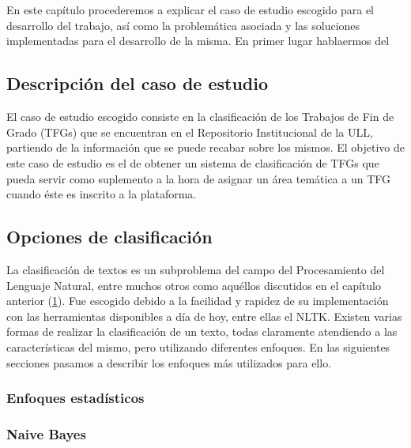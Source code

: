 \chapter{\ChapterTwo{}} \label{amigo}
\lhead{\emph{\ChapterTwo{}}}

En este capítulo procederemos a explicar el caso de estudio escogido para el desarrollo del trabajo, así como la problemática asociada y las soluciones implementadas para el desarrollo de la misma. En primer lugar hablaermos del 

\section{Descripción del caso de estudio}

El caso de estudio escogido consiste en la clasificación de los Trabajos de Fin de Grado (TFGs) que se encuentran en el Repositorio Institucional de la ULL, partiendo de la información que se puede recabar sobre los mismos.
%
El objetivo de este caso de estudio es el de obtener un sistema de clasificación de TFGs que pueda servir como suplemento a la hora de asignar un área temática a un TFG cuando éste es inscrito a la plataforma.

\section{Opciones de clasificación}

La clasificación de textos es un subproblema del campo del Procesamiento del Lenguaje Natural, entre muchos otros como aquéllos discutidos en el capítulo anterior (\ref{amigo}).
%
Fue escogido debido a la facilidad y rapidez de su implementación con las herramientas disponibles a día de hoy, entre ellas el NLTK.
%
Existen varias formas de realizar la clasificación de un texto, todas claramente atendiendo a las características del mismo, pero utilizando diferentes enfoques.
%
En las siguientes secciones pasamos a describir los enfoques más utilizados para ello.

\subsection{Enfoques estadísticos}



\subsection{Naive Bayes}

